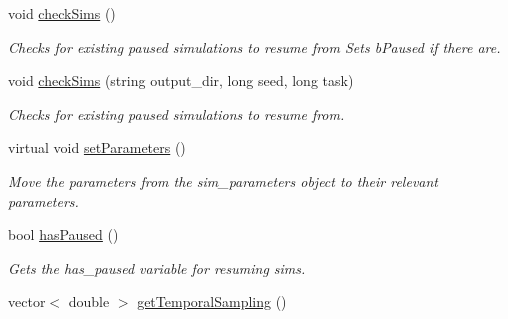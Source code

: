 \begin{DoxyCompactItemize}
void \hyperlink{class_tree_ad0bcc474a9ab1d4e3e2458c4de7304ad}{check\+Sims} ()
\begin{DoxyCompactList}\small\item\em Checks for existing paused simulations to resume from Sets b\+Paused if there are. \end{DoxyCompactList}\item 
void \hyperlink{class_tree_aafaede1da6c79583bf2e28b7a1881a5c}{check\+Sims} (string output\+\_\+dir, long seed, long task)
\begin{DoxyCompactList}\small\item\em Checks for existing paused simulations to resume from. \end{DoxyCompactList}\item 
virtual void \hyperlink{class_tree_ac374d237b7e2e7e11f6a0ff395003635}{set\+Parameters} ()\hypertarget{class_tree_ac374d237b7e2e7e11f6a0ff395003635}{}\label{class_tree_ac374d237b7e2e7e11f6a0ff395003635}

\begin{DoxyCompactList}\small\item\em Move the parameters from the sim\+\_\+parameters object to their relevant parameters. \end{DoxyCompactList}\item 
bool \hyperlink{class_tree_ae07761c0a91a44ebe459904b1b8ffb43}{has\+Paused} ()
\begin{DoxyCompactList}\small\item\em Gets the has\+\_\+paused variable for resuming sims. \end{DoxyCompactList}\item 
vector$<$ double $>$ \hyperlink{class_tree_ac03c034a5730ee4f4d8727aace776412}{get\+Temporal\+Sampling} ()\hypertarget{class_tree_ac03c034a5730ee4f4d8727aace776412}{}\label{class_tree_ac03c034a5730ee4f4d8727aace776412}


\end{DoxyCompactItemize}

